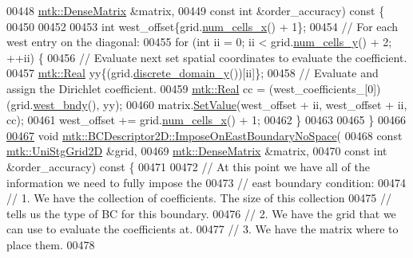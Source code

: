 \begin{DoxyCode}
00448     \hyperlink{classmtk_1_1DenseMatrix}{mtk::DenseMatrix} &matrix,
00449     \textcolor{keyword}{const} \textcolor{keywordtype}{int} &order\_accuracy)\textcolor{keyword}{ const }\{
00450 
00452 
00453   \textcolor{keywordtype}{int} west\_offset\{grid.\hyperlink{classmtk_1_1UniStgGrid2D_a2d182866a398aba8e4829590e85bf939}{num\_cells\_x}() + 1\};
00454   \textcolor{comment}{// For each west entry on the diagonal:}
00455   \textcolor{keywordflow}{for} (\textcolor{keywordtype}{int} ii = 0; ii < grid.\hyperlink{classmtk_1_1UniStgGrid2D_aed05a801cc9a76dba0ff203cea58a61a}{num\_cells\_y}() + 2; ++ii) \{
00456     \textcolor{comment}{// Evaluate next set spatial coordinates to evaluate the coefficient.}
00457     \hyperlink{group__c01-roots_gac080bbbf5cbb5502c9f00405f894857d}{mtk::Real} yy\{(grid.\hyperlink{classmtk_1_1UniStgGrid2D_ac33a58d65105550dcf6f6b92b48b5105}{discrete\_domain\_y}())[ii]\};
00458     \textcolor{comment}{// Evaluate and assign the Dirichlet coefficient.}
00459     \hyperlink{group__c01-roots_gac080bbbf5cbb5502c9f00405f894857d}{mtk::Real} cc = (west\_coefficients\_[0])(grid.\hyperlink{classmtk_1_1UniStgGrid2D_af2b1712387ded85edaf2b64617d3fc13}{west\_bndy}(), yy);
00460     matrix.\hyperlink{classmtk_1_1DenseMatrix_a784ce5784109ac86bfb9d8562b334b13}{SetValue}(west\_offset + ii, west\_offset + ii, cc);
00461     west\_offset += grid.\hyperlink{classmtk_1_1UniStgGrid2D_a2d182866a398aba8e4829590e85bf939}{num\_cells\_x}() + 1;
00462   \}
00463 
00465 \}
00466 
\hypertarget{mtk__bc__descriptor__2d_8cc_source_l00467}{}\hyperlink{classmtk_1_1BCDescriptor2D_a65f58f43f3fdc793cce7293780b70b80}{00467} \textcolor{keywordtype}{void} \hyperlink{classmtk_1_1BCDescriptor2D_a65f58f43f3fdc793cce7293780b70b80}{mtk::BCDescriptor2D::ImposeOnEastBoundaryNoSpace}(
00468     \textcolor{keyword}{const} \hyperlink{classmtk_1_1UniStgGrid2D}{mtk::UniStgGrid2D} &grid,
00469     \hyperlink{classmtk_1_1DenseMatrix}{mtk::DenseMatrix} &matrix,
00470     \textcolor{keyword}{const} \textcolor{keywordtype}{int} &order\_accuracy)\textcolor{keyword}{ const }\{
00471 
00472   \textcolor{comment}{// At this point we have all of the information we need to fully impose the}
00473   \textcolor{comment}{// east boundary condition:}
00474   \textcolor{comment}{// 1. We have the collection of coefficients. The size of this collection}
00475   \textcolor{comment}{// tells us the type of BC for this boundary.}
00476   \textcolor{comment}{// 2. We have the grid that we can use to evaluate the coefficients at.}
00477   \textcolor{comment}{// 3. We have the matrix where to place them.}
00478 

\end{DoxyCode}
